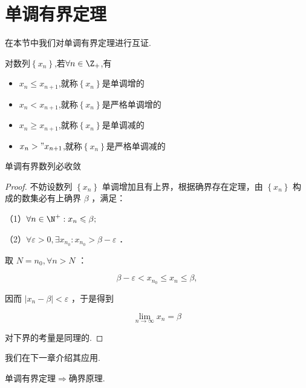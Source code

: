 \section{单调有界定理}
在本节中我们对单调有界定理进行互证.
\begin{definition}
	对数列$\left\{x_n\right\}$,若$\forall n\in\Z_+$,有
	\begin{itemize}
		\item $x_n\leqslant x_{n+1}$,就称$\left\{x_n\right\}$是单调增的
		\item$x_n< x_{n+1}$,就称$\left\{x_n\right\}$是严格单调增的
		\item$x_n\geqslant x_{n+1}$,就称$\left\{x_n\right\}$是单调减的
		\item$x_n>" x_{n+1}$,就称$\left\{x_n\right\}$是严格单调减的
	\end{itemize}
\end{definition}
\begin{theorem}
	单调有界数列必收敛
\end{theorem}
\begin{proof}
	不妨设数列 $\left\{x_n\right\}$ 单调增加且有上界，根据确界存在定理，由 $\left\{x_n\right\}$ 构成的数集必有上确界 $\beta$ ，满足：
	
	（1）$\forall n \in \N^{+}: x_n \leqslant \beta ;$
	
	（2）$\forall \varepsilon>0, \exists x_{n_0}: x_{n_0}>\beta-\varepsilon$ ．
	
	取 $N=n_0, \forall n>N$ ：
	
	$$
	\beta-\varepsilon<x_{n_0} \leqslant x_n \leqslant \beta,
	$$
	
	
	因而 $\left|x_n-\beta\right|<\varepsilon$ ，于是得到
	
	$$
	\lim _{n \rightarrow \infty} x_n=\beta
	$$
	
	对下界的考量是同理的.
\end{proof}
我们在下一章介绍其应用.
\begin{proposition}
	单调有界定理$\Rightarrow$确界原理.
\end{proposition}

